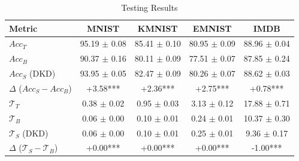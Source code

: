 \begin{table}
	\centering
	\caption{Testing Results}
	\label{tab:combined-test-dkd}
	\begin{tabular}{lcccc}
		\hline
		Metric & MNIST & KMNIST & EMNIST & IMDB \\
		\hline
		$Acc_T$ & 95.19 $\pm$ 0.08 & 85.41 $\pm$ 0.10 & 80.95 $\pm$ 0.09 & 88.96 $\pm$ 0.04 \\
		$Acc_B$ & 90.37 $\pm$ 0.16 & 80.11 $\pm$ 0.09 & 77.51 $\pm$ 0.07 & 87.85 $\pm$ 0.24 \\
		$Acc_S$ (DKD) & 93.95 $\pm$ 0.05 & 82.47 $\pm$ 0.09 & 80.26 $\pm$ 0.07 & 88.62 $\pm$ 0.03 \\
		$\Delta$ ($Acc_S-Acc_B$) & +3.58*** & +2.36*** & +2.75*** & +0.78*** \\
		\hline
		$\mathcal{T}_T$ & 0.38 $\pm$ 0.02 & 0.95 $\pm$ 0.03 & 3.13 $\pm$ 0.12 & 17.88 $\pm$ 0.71 \\
		$\mathcal{T}_B$ & 0.06 $\pm$ 0.00 & 0.10 $\pm$ 0.01 & 0.24 $\pm$ 0.01 & 10.37 $\pm$ 0.30 \\
		$\mathcal{T}_S$ (DKD)& 0.06 $\pm$ 0.00 & 0.10 $\pm$ 0.01 & 0.25 $\pm$ 0.01 & 9.36 $\pm$ 0.17 \\
		$\Delta$ ($\mathcal{T}_S-\mathcal{T}_B$) & +0.00*** & +0.00*** & +0.00*** & -1.00*** \\
		\hline
	\end{tabular}
\end{table}
